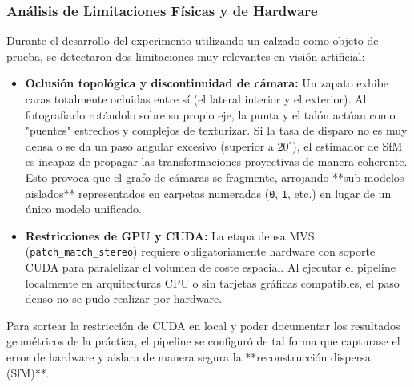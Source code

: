 \documentclass[12pt,a4paper]{article}
\begin{document}
\subsubsection*{Análisis de Limitaciones Físicas y de Hardware}
Durante el desarrollo del experimento utilizando un calzado como objeto de prueba, se detectaron dos limitaciones muy relevantes en visión artificial:
\begin{itemize}
    \item \textbf{Oclusión topológica y discontinuidad de cámara:} Un zapato exhibe caras totalmente ocluidas entre sí (el lateral interior y el exterior). Al fotografiarlo rotándolo sobre su propio eje, la punta y el talón actúan como "puentes" estrechos y complejos de texturizar. Si la tasa de disparo no es muy densa o se da un paso angular excesivo (superior a $20^{\circ}$), el estimador de SfM es incapaz de propagar las transformaciones proyectivas de manera coherente. Esto provoca que el grafo de cámaras se fragmente, arrojando **sub-modelos aislados** representados en carpetas numeradas (\texttt{0}, \texttt{1}, etc.) en lugar de un único modelo unificado.
    \item \textbf{Restricciones de GPU y CUDA:} La etapa densa MVS (\texttt{patch\_match\_stereo}) requiere obligatoriamente hardware con soporte CUDA para paralelizar el volumen de coste espacial. Al ejecutar el pipeline localmente en arquitecturas CPU o sin tarjetas gráficas compatibles, el paso denso no se pudo realizar por hardware.
\end{itemize}


Para sortear la restricción de CUDA en local y poder documentar los resultados geométricos de la práctica, el pipeline se configuró de tal forma que capturase el error de hardware y aislara de manera segura la **reconstrucción dispersa (SfM)**. 
\end{document}
